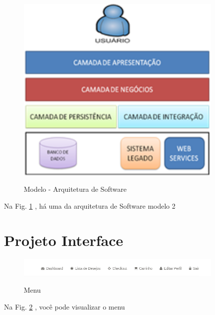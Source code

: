                 
                  \begin{figure}[H]
                 \caption{Modelo - Arquitetura de Software}
               \centering %
                \includegraphics[width=10cm]{analisedeProjeto/arSoft2} %
                \label{figura:arSoft2}
                \end{figure}
                Na Fig. \ref{figura:arSoft2} , há uma da arquitetura de Software modelo 2
                
                
                
                
                
                
                
                \section{Projeto Interface}
                
                 
               \begin{figure}[H]
                 \caption{Menu}
               \centering %
                \includegraphics[width=10cm]{analisedeProjeto/menu} %
                \label{figura:menu}
                \end{figure}
                Na Fig. \ref{figura:menu} ,  você pode visualizar o menu
                
